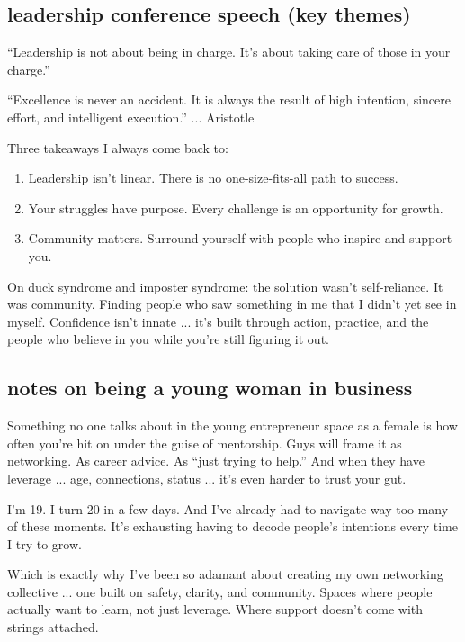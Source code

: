 \documentclass[12pt, letterpaper]{article}
\newenvironment{jadequote}{%
  \begin{mdframed}[backgroundcolor=soft, linecolor=moxie, linewidth=1pt,
    innerleftmargin=10pt, innerrightmargin=10pt,
    innertopmargin=8pt, innerbottommargin=8pt]
  \itshape
}{%
  \end{mdframed}
}
\begin{document}
\subsection{leadership conference speech (key themes)}

\begin{jadequote}
``Leadership is not about being in charge. It's about taking care of those in your charge.''
\end{jadequote}

\begin{jadequote}
``Excellence is never an accident. It is always the result of high intention, sincere effort, and intelligent execution.'' ... Aristotle
\end{jadequote}

Three takeaways I always come back to:
\begin{enumerate}[leftmargin=*, label=\arabic*.]
  \item Leadership isn't linear. There is no one-size-fits-all path to success.
  \item Your struggles have purpose. Every challenge is an opportunity for growth.
  \item Community matters. Surround yourself with people who inspire and support you.
\end{enumerate}

On duck syndrome and imposter syndrome: the solution wasn't self-reliance. It was community. Finding people who saw something in me that I didn't yet see in myself. Confidence isn't innate ... it's built through action, practice, and the people who believe in you while you're still figuring it out.

\subsection{notes on being a young woman in business}

\begin{jadequote}
Something no one talks about in the young entrepreneur space as a female is how often you're hit on under the guise of mentorship. Guys will frame it as networking. As career advice. As ``just trying to help.'' And when they have leverage ... age, connections, status ... it's even harder to trust your gut.

I'm 19. I turn 20 in a few days. And I've already had to navigate way too many of these moments. It's exhausting having to decode people's intentions every time I try to grow.

Which is exactly why I've been so adamant about creating my own networking collective ... one built on safety, clarity, and community. Spaces where people actually want to learn, not just leverage. Where support doesn't come with strings attached.
\end{jadequote}
\end{document}
